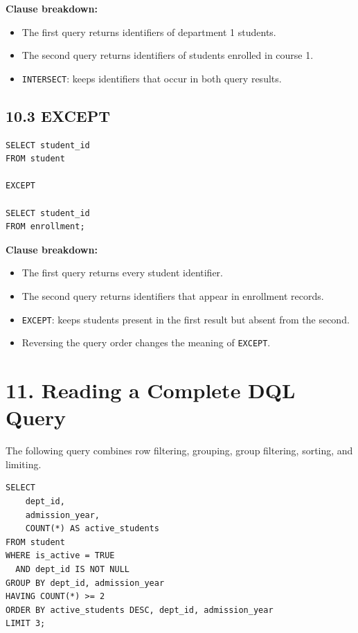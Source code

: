 \documentclass[12pt,a4paper]{article}
\begin{document}
\noindent\textbf{Clause breakdown:}
\begin{itemize}
    \item The first query returns identifiers of department 1 students.
    \item The second query returns identifiers of students enrolled in course 1.
    \item \texttt{INTERSECT}: keeps identifiers that occur in both query results.
\end{itemize}

\subsection*{10.3 EXCEPT}
\begin{verbatim}
SELECT student_id
FROM student

EXCEPT

SELECT student_id
FROM enrollment;
\end{verbatim}

\noindent\textbf{Clause breakdown:}
\begin{itemize}
    \item The first query returns every student identifier.
    \item The second query returns identifiers that appear in enrollment records.
    \item \texttt{EXCEPT}: keeps students present in the first result but absent from the second.
    \item Reversing the query order changes the meaning of \texttt{EXCEPT}.
\end{itemize}

\section*{11. Reading a Complete DQL Query}
The following query combines row filtering, grouping, group filtering, sorting, and limiting.

\begin{verbatim}
SELECT
    dept_id,
    admission_year,
    COUNT(*) AS active_students
FROM student
WHERE is_active = TRUE
  AND dept_id IS NOT NULL
GROUP BY dept_id, admission_year
HAVING COUNT(*) >= 2
ORDER BY active_students DESC, dept_id, admission_year
LIMIT 3;
\end{verbatim}
\end{document}
